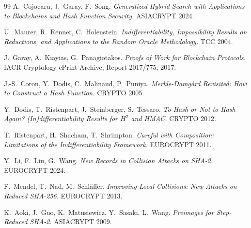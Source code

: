 \documentclass[11pt]{article}
\begin{document}
\begin{thebibliography}{99}
A.~Cojocaru, J.~Garay, F.~Song.
\emph{Generalized Hybrid Search with Applications to Blockchains and Hash
Function Security.}
ASIACRYPT 2024.

U.~Maurer, R.~Renner, C.~Holenstein.
\emph{Indifferentiability, Impossibility Results on Reductions, and
Applications to the Random Oracle Methodology.}
TCC 2004.

J.~Garay, A.~Kiayias, G.~Panagiotakos.
\emph{Proofs of Work for Blockchain Protocols.}
IACR Cryptology ePrint Archive, Report 2017/775, 2017.

J.-S.~Coron, Y.~Dodis, C.~Malinaud, P.~Puniya.
\emph{Merkle-Damg\aa rd Revisited: How to Construct a Hash Function.}
CRYPTO 2005.

Y.~Dodis, T.~Ristenpart, J.~Steinberger, S.~Tessaro.
\emph{To Hash or Not to Hash Again? (In)differentiability Results for
$H^2$ and HMAC.}
CRYPTO 2012.

T.~Ristenpart, H.~Shacham, T.~Shrimpton.
\emph{Careful with Composition: Limitations of the Indifferentiability
Framework.}
EUROCRYPT 2011.

Y.~Li, F.~Liu, G.~Wang.
\emph{New Records in Collision Attacks on SHA-2.}
EUROCRYPT 2024.

F.~Mendel, T.~Nad, M.~Schl\"affer.
\emph{Improving Local Collisions: New Attacks on Reduced SHA-256.}
EUROCRYPT 2013.

K.~Aoki, J.~Guo, K.~Matusiewicz, Y.~Sasaki, L.~Wang.
\emph{Preimages for Step-Reduced SHA-2.}
ASIACRYPT 2009.

\end{thebibliography}
\end{document}
